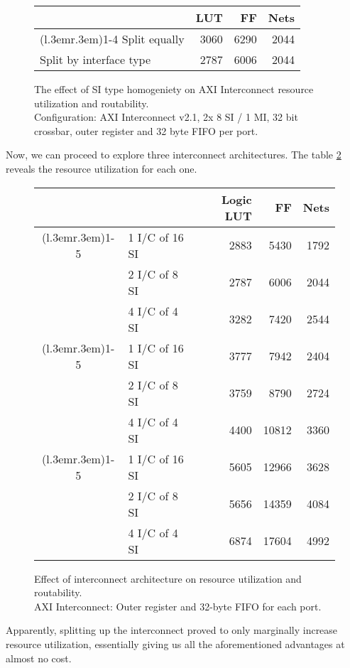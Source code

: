 \begin{figure}[ht!]
\centering
\begin{tabular}{lrrr}
\toprule
			& LUT	& FF	& Nets \\
\cmidrule(l{.3em}r{.3em}){1-4}
Split equally 		& 3060	&6290	&2044 	\\
Split by interface type	& 2787	&6006	& 2044	\\
\bottomrule
\end{tabular}
\caption{The effect of SI type homogeniety on AXI Interconnect resource utilization and routability.\\
	Configuration: AXI Interconnect v2.1, 2x 8 SI / 1 MI, 32 bit crossbar, 
	outer register and 32 byte FIFO per port.}
\label{tab:int-mixed}
\end{figure}

Now, we can proceed to explore three interconnect architectures.
The table \ref{tab:int-msi} reveals the resource utilization for each one.

\begin{figure}[ht!]
\centering
\begin{tabular}{cl rrr}
\toprule
&		&Logic LUT & FF	& Nets \\
\cmidrule(l{.3em}r{.3em}){1-5}
\multirow{3}{*}{\rotatebox{90}{32 bit}}			
&1 I/C of 16 SI	& 2883	& 5430	& 1792 	\\
&2 I/C of 8 SI	& 2787	& 6006	& 2044	\\
&4 I/C of 4 SI	& 3282	& 7420	& 2544	\\
\cmidrule(l{.3em}r{.3em}){1-5}
\multirow{3}{*}{\rotatebox{90}{64 bit}}
&1 I/C of 16 SI	& 3777	& 7942 	& 2404	\\
&2 I/C of 8 SI	& 3759	& 8790	& 2724	\\
&4 I/C of 4 SI	& 4400	&10812	& 3360	\\
\cmidrule(l{.3em}r{.3em}){1-5}
\multirow{3}{*}{\rotatebox{90}{128 bit}}
&1 I/C of 16 SI	& 5605	& 12966	& 3628	\\
&2 I/C of 8 SI	& 5656	& 14359	& 4084	\\
&4 I/C of 4 SI	& 6874	& 17604	& 4992	\\
\bottomrule
\end{tabular}
\caption{Effect of interconnect architecture on resource utilization and routability.\\
	AXI Interconnect: Outer register and 32-byte FIFO for each port.}
\label{tab:int-msi}
\end{figure}

Apparently, splitting up the interconnect proved to only marginally increase
resource utilization, essentially giving us all the aforementioned advantages at almost no cost.


